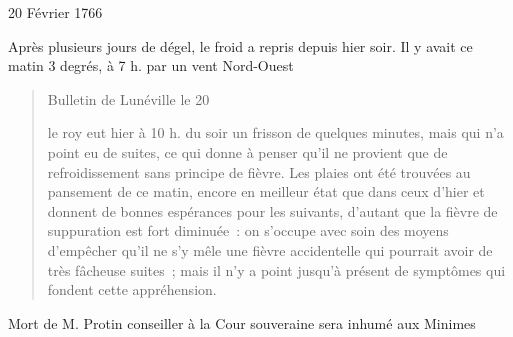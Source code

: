                      \begin{diary}{20 Février 1766}{}
                        
                         Après plusieurs jours de dégel, le
                           froid
                           a repris depuis hier soir. Il y avait
                           ce matin 3 degrés, à 7 h. par un
                           vent
                           Nord-Ouest
                        \bigskip
        
        
                        \begin{quote}\begin{flushright}Bulletin de Lunéville
                              le 20\end{flushright}
                              le roy
                                 eut hier à 10 h. du soir un
                                 frisson
                                 de quelques minutes, mais qui n'a point
                                 eu de suites, ce qui donne à penser qu'il ne
                              provient que de refroidissement sans principe
                              de fièvre. Les plaies ont été trouvées au
                              pansement de ce matin, encore en meilleur
                              état que dans ceux d'hier et donnent de
                              bonnes espérances pour les suivants, d'autant
                              que la fièvre de suppuration est fort
                              diminuée : on s'occupe avec soin des
                              moyens d'empêcher qu'il ne s'y mêle une
                              fièvre accidentelle qui pourrait avoir de
                              très fâcheuse suites ; mais il n'y a point
                              jusqu'à présent de symptômes qui fondent
                              cette appréhension. \bigskip
        
        \end{quote}
                         Mort de M.
                              Protin
                           conseiller à la Cour souveraine sera inhumé aux Minimes
                        \bigskip
        
        
                     \end{diary}
                     
